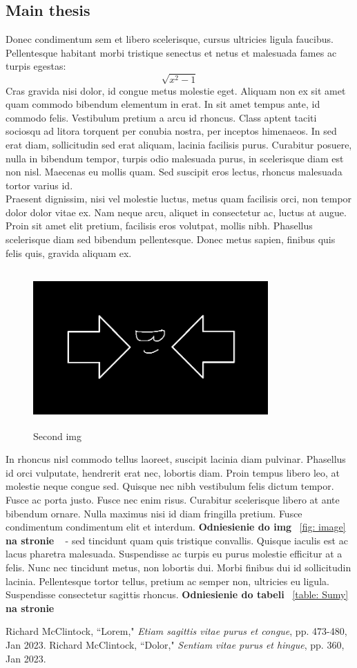 \documentclass[12pt,a4paper]{article}
\begin{document}
\subsection{Main thesis}
	Donec condimentum sem et libero scelerisque, cursus ultricies ligula faucibus. Pellentesque habitant morbi tristique senectus et netus et malesuada fames ac turpis egestas:
	\[\sqrt{x^2-1}\] 
	Cras gravida nisi dolor, id congue metus molestie eget. Aliquam non ex sit amet quam commodo bibendum elementum in erat. In sit amet tempus ante, id commodo felis. Vestibulum pretium a arcu id rhoncus. Class aptent taciti sociosqu ad litora torquent 			per conubia nostra, per inceptos himenaeos. 
	In  sed erat diam, sollicitudin sed erat aliquam, lacinia facilisis purus. Curabitur posuere, nulla in bibendum tempor, turpis odio malesuada purus, in scelerisque diam est non nisl. Maecenas eu mollis quam. Sed suscipit eros lectus, rhoncus 			malesuada tortor varius id. \\Praesent dignissim, nisi vel molestie luctus, metus quam facilisis orci, non tempor dolor dolor vitae ex. Nam neque arcu, aliquet in consectetur ac, luctus at augue. Proin sit amet elit pretium, facilisis eros volutpat, mollis nibh. 			Phasellus scelerisque diam sed bibendum pellentesque. Donec metus sapien, finibus quis felis quis, gravida aliquam ex.
	

	\begin{figure}[H]
		\centering
		\includegraphics[width=9cm, height=6cm]{img2.jpg}
		\caption{Second img}
		\label{fig: image2}
	\end{figure}

In rhoncus nisl commodo tellus laoreet, suscipit lacinia diam pulvinar. Phasellus id orci vulputate, hendrerit erat nec, lobortis diam. Proin tempus libero leo, at molestie neque congue sed. Quisque nec nibh vestibulum felis dictum tempor. Fusce ac porta justo. Fusce nec enim risus. Curabitur scelerisque libero at ante bibendum ornare. Nulla maximus nisi id diam fringilla pretium. Fusce condimentum condimentum elit et interdum. \textbf{Odniesienie do img} ~\ref{fig: image} \textbf{na stronie} ~\pageref{fig: image} - sed tincidunt quam quis tristique convallis.
	Quisque iaculis est ac lacus pharetra malesuada. Suspendisse ac turpis eu purus molestie efficitur at a felis. Nunc nec tincidunt metus, non lobortis dui. Morbi finibus dui id sollicitudin lacinia. Pellentesque tortor tellus, pretium ac semper non, ultricies eu ligula. Suspendisse consectetur sagittis rhoncus. \textbf{Odniesienie do tabeli} ~\ref{table: Sumy} \textbf{na stronie} ~\pageref{table: Sumy}

\newpage
	\begin{thebibliography}{10}
		Richard McClintock, ``Lorem," \emph{Etiam sagittis vitae purus et congue}, pp. 473-480, Jan 2023.
		Richard McClintock, ``Dolor," \emph{Sentiam vitae purus et hingue}, pp. 360, Jan 2023.
	\end{thebibliography}
	
\end{document}
